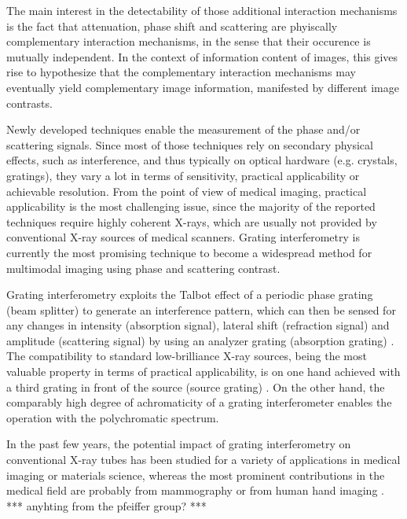 \documentclass[aps,prl,floatfix,twocolumn,10pt]{revtex4-1}  %
\begin{document}
The main interest in the detectability of those additional interaction mechanisms is the fact that attenuation, phase shift and scattering are phyiscally complementary interaction mechanisms, in the sense that their occurence is mutually independent. In the context of information content of images, this gives rise to hypothesize that the complementary interaction mechanisms may eventually yield complementary image information, manifested by different image contrasts.

Newly developed techniques enable the measurement of the phase and/or scattering signals. Since most of those techniques rely on secondary physical effects, such as interference, and thus typically on optical hardware (e.g. crystals, gratings), they vary a lot in terms of sensitivity, practical applicability or achievable resolution. From the point of view of medical imaging, practical applicability is the most challenging issue, since the majority of the reported techniques require highly coherent X-rays, which are usually not provided by conventional X-ray sources of medical scanners. Grating interferometry is currently the most promising technique to become a widespread method for multimodal imaging using phase and scattering contrast.

Grating interferometry exploits the Talbot effect of a periodic phase grating (beam splitter) to generate an interference pattern, which can then be sensed for any changes in intensity (absorption signal), lateral shift \cite{David2002} (refraction signal) and amplitude \cite{Pfeiffer2008} (scattering signal) by using an analyzer grating (absorption grating) \cite{Momose2003a}. The compatibility to standard low-brilliance X-ray sources, being the most valuable property in terms of practical applicability, is on one hand achieved with a third grating in front of the source (source grating) \cite{Pfeiffer2006}. On the other hand, the comparably high degree of achromaticity of a grating interferometer enables the operation with the polychromatic spectrum.

In the past few years, the potential impact of grating interferometry on conventional X-ray tubes has been studied for a variety of applications in medical imaging or materials science, whereas the most prominent contributions in the medical field are probably from mammography \cite{Stampanoni2011} or from human hand imaging \cite{Donath2010a,Thuering2013}. *** anyhting from the pfeiffer group? *** 
\end{document}
